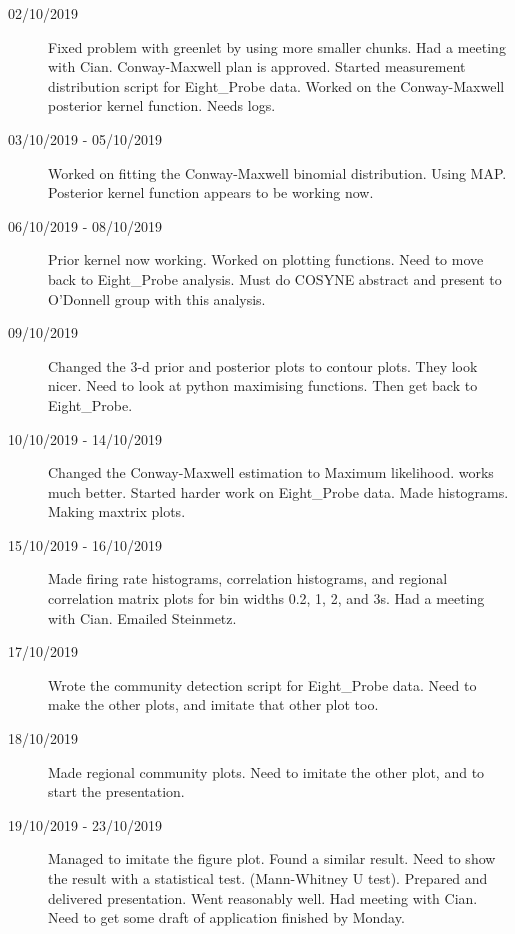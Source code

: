 \documentclass[a4paper,12pt]{article}
\theoremstyle{definition}
\begin{document}
\begin{description}
                                \item[02/10/2019] Fixed problem with greenlet by using more smaller chunks. Had a meeting with Cian. Conway-Maxwell plan is approved. Started measurement distribution script for Eight\_Probe data. Worked on the Conway-Maxwell posterior kernel function. Needs logs.

                                \item[03/10/2019 - 05/10/2019] Worked on fitting the Conway-Maxwell binomial distribution. Using MAP. Posterior kernel function appears to be working now.

                                \item[06/10/2019 - 08/10/2019] Prior kernel now working. Worked on plotting functions. Need to move back to Eight\_Probe analysis. Must do COSYNE abstract and present to O'Donnell group with this analysis.

                                \item[09/10/2019] Changed the 3-d prior and posterior plots to contour plots. They look nicer. Need to look at python maximising functions. Then get back to Eight\_Probe.

                                \item[10/10/2019 - 14/10/2019] Changed the Conway-Maxwell estimation to Maximum likelihood. works much better. Started harder work on Eight\_Probe data. Made histograms. Making maxtrix plots.

                                \item[15/10/2019 - 16/10/2019] Made firing rate histograms, correlation histograms, and regional correlation matrix plots for bin widths 0.2, 1, 2, and 3s. Had a meeting with Cian. Emailed Steinmetz.

                                \item[17/10/2019] Wrote the community detection script for Eight\_Probe data. Need to make the other plots, and imitate that other plot too.

                                \item[18/10/2019] Made regional community plots. Need to imitate the other plot, and to start the presentation.

                                \item[19/10/2019 - 23/10/2019] Managed to imitate the figure plot. Found a similar result. Need to show the result with a statistical test. (Mann-Whitney U test). Prepared and delivered presentation. Went reasonably well. Had meeting with Cian. Need to get some draft of application finished by Monday.


\end{description}
\end{document}
